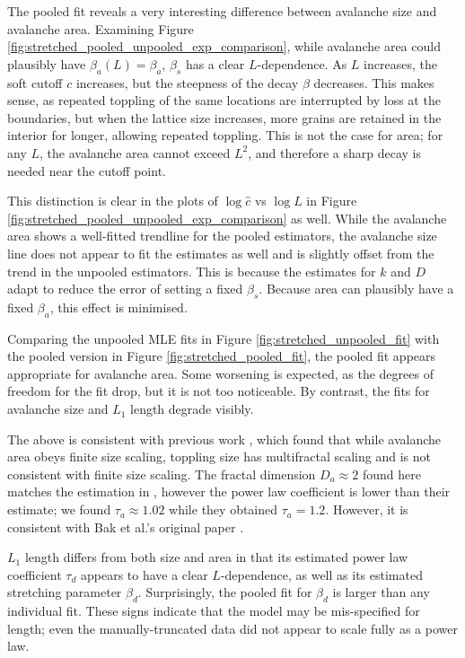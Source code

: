 The pooled fit reveals a very interesting difference between avalanche size and avalanche area. Examining Figure \ref{fig:stretched_pooled_unpooled_exp_comparison}, while avalanche area could plausibly have $\beta_a(L) = \beta_a$, $\beta_s$ has a clear $L$-dependence. As $L$ increases, the soft cutoff $c$ increases, but the steepness of the decay $\beta$ decreases. This makes sense, as repeated toppling of the same locations are interrupted by loss at the boundaries, but when the lattice size increases, more grains are retained in the interior for longer, allowing repeated toppling. This is not the case for area; for any $L$, the avalanche area cannot exceed $L^2$, and therefore a sharp decay is needed near the cutoff point. 

This distinction is clear in the plots of $\log \hat{c}$ vs $\log L$ in Figure \ref{fig:stretched_pooled_unpooled_exp_comparison} as well. While the avalanche area shows a well-fitted trendline for the pooled estimators, the avalanche size line does not appear to fit the estimates as well and is slightly offset from the trend in the unpooled estimators. This is because the estimates for $k$ and $D$ adapt to reduce the error of setting a fixed $\beta_s$. Because area can plausibly have a fixed $\beta_a$, this effect is minimised.

Comparing the unpooled MLE fits in Figure \ref{fig:stretched_unpooled_fit} with the pooled version in Figure \ref{fig:stretched_pooled_fit}, the pooled fit appears appropriate for avalanche area. Some worsening is expected, as the degrees of freedom for the fit drop, but it is not too noticeable. By contrast, the fits for avalanche size and $L_1$ length degrade visibly.

The above is consistent with previous work \cite{tebaldi1999multifractal}, which found that while avalanche area obeys finite size scaling, toppling size has multifractal scaling and is not consistent with finite size scaling. The fractal dimension $D_a \approx 2$ found here matches the estimation in \cite{tebaldi1999multifractal}, however the power law coefficient is lower than their estimate; we found $\tau_a \approx 1.02$ while they obtained $\tau_a = 1.2$. However, it is consistent with Bak et al.'s original paper \cite{btw1987intro}.

$L_1$ length differs from both size and area in that its estimated power law coefficient $\tau_d$ appears to have a clear $L$-dependence, as well as its estimated stretching parameter $\beta_d$. Surprisingly, the pooled fit for $\beta_d$ is larger than any individual fit. These signs indicate that the model may be mis-specified for length; even the manually-truncated data did not appear to scale fully as a power law. 

